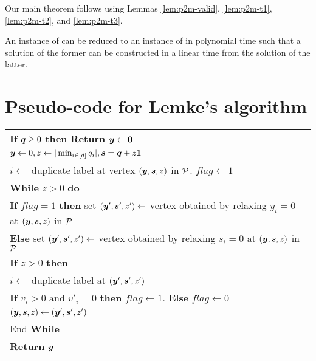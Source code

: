 Our main theorem follows using Lemmas \ref{lem:p2m-valid}, \ref{lem:p2m-t1}, \ref{lem:p2m-t2}, and \ref{lem:p2m-t3}.

\begin{theorem}\label{thm:p2m}
An instance of \EOPL can be reduced to an instance of \EOML in polynomial time such that a solution of the former can be constructed in a linear time from the solution of the latter. 
\end{theorem}

\section{Pseudo-code for Lemke's algorithm}
\label{app:lemke}

\begin{tabular}{|l|}
\hline
\hspace{5pt} {\bf If} $\mbox{\boldmath $q$}\ge 0$ {\bf then} {\bf Return} $\mbox{\boldmath $y$}\leftarrow \mbox{\boldmath $0$}$ \\
\hspace{5pt} $\mbox{\boldmath $y$}\leftarrow 0, z\leftarrow |\min_{i \in [d]} q_i|, \mbox{\boldmath $s$}=\mbox{\boldmath $q$}+z\mbox{\boldmath $1$}$\\
\hspace{5pt} $i\leftarrow $ duplicate label at vertex $(\mbox{\boldmath $y$},\mbox{\boldmath $s$},z)$ in $\mbox{${\mathcal P}$}$. $flag\leftarrow 1$ \\
\hspace{5pt} {\bf While} $z>0$ {\bf do}\\
\hspace{10pt} {\bf If} $flag=1$ {\bf then} set $(\mbox{\boldmath $y$}',\mbox{\boldmath $s$}',z')\leftarrow $ vertex obtained by relaxing $y_i=0$ at $(\mbox{\boldmath $y$},\mbox{\boldmath $s$},z)$ in $\mbox{${\mathcal P}$}$\\
\hspace{10pt} {\bf Else} set $(\mbox{\boldmath $y$}',\mbox{\boldmath $s$}',z')\leftarrow $ vertex obtained by relaxing $s_i=0$ at $(\mbox{\boldmath $y$},\mbox{\boldmath $s$},z)$ in $\mbox{${\mathcal P}$}$\\
\hspace{10pt} {\bf If} $z>0$ {\bf then}\\
\hspace{15pt} $i \leftarrow $ duplicate label at $(\mbox{\boldmath $y$}',\mbox{\boldmath $s$}',z')$\\
\hspace{15pt} {\bf If} $v_i>0$ and $v'_i=0$ {\bf then} $flag\leftarrow 1$. {\bf Else} $flag\leftarrow 0$\\
\hspace{15pt} $(\mbox{\boldmath $y$},\mbox{\boldmath $s$},z)\leftarrow(\mbox{\boldmath $y$}',\mbox{\boldmath $s$}',z')$\\
\hspace{5pt} End {\bf While} \\
\hspace{5pt} {\bf Return} $\mbox{\boldmath $y$}$\\
\hline
\end{tabular}

